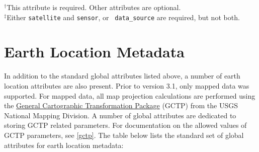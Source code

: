 $^{\dagger}$This attribute is required. Other attributes are
optional.\\
$^{\ddagger}$Either {\tt satellite} and {\tt sensor}, or {\tt
data\_source} are required, but not both.

\section{Earth Location Metadata}

In addition to the standard global attributes listed above, a number
of earth location attributes are also present. Prior to version 3.1,
only mapped data was supported. For mapped data, all map projection
calculations are performed using the
\href{http://edcwww.cr.usgs.gov/pub/software/gctpc}{General
Cartographic Transformation Package} (GCTP) from the USGS National
Mapping Division. A number of global attributes are dedicated to
storing GCTP related parameters. For documentation on the allowed
values of GCTP parameters, see \autoref{gctp}.  The table below lists
the standard set of global attributes for earth location metadata:

